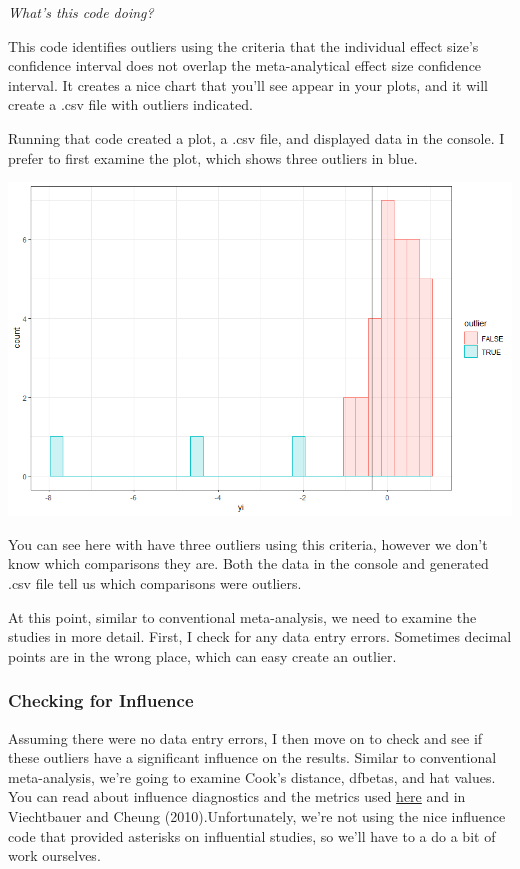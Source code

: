 \documentclass[
]{book}
\begin{document}
\emph{What's this code doing?}

This code identifies outliers using the criteria that the individual effect size's confidence interval does not overlap the meta-analytical effect size confidence interval. It creates a nice chart that you'll see appear in your plots, and it will create a .csv file with outliers indicated.

Running that code created a plot, a .csv file, and displayed data in the console. I prefer to first examine the plot, which shows three outliers in blue.

\includegraphics[width=1\textwidth,height=\textheight]{images/outliers3level.png}

You can see here with have three outliers using this criteria, however we don't know which comparisons they are. Both the data in the console and generated .csv file tell us which comparisons were outliers.

At this point, similar to conventional meta-analysis, we need to examine the studies in more detail. First, I check for any data entry errors. Sometimes decimal points are in the wrong place, which can easy create an outlier.

\hypertarget{checking-for-influence}{%
\subsubsection{Checking for Influence}\label{checking-for-influence}}

Assuming there were no data entry errors, I then move on to check and see if these outliers have a significant influence on the results. Similar to conventional meta-analysis, we're going to examine Cook's distance, dfbetas, and hat values. You can read about influence diagnostics and the metrics used \href{https://wviechtb.github.io/metafor/reference/influence.rma.mv.html}{here} and in Viechtbauer and Cheung (2010)\citep{viechtbauer2010b}.Unfortunately, we're not using the nice influence code that provided asterisks on influential studies, so we'll have to a do a bit of work ourselves.
\end{document}
